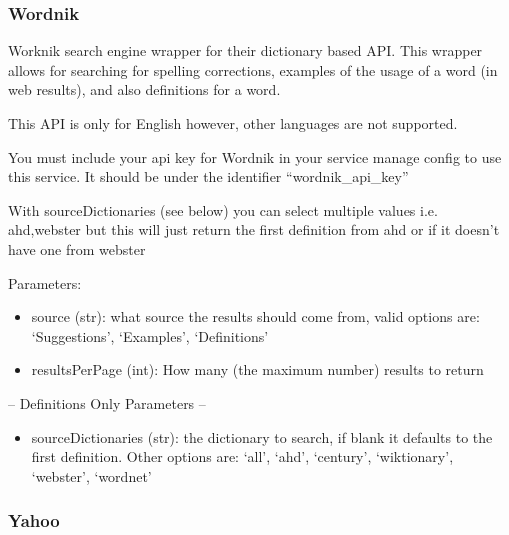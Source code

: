 \documentclass[letterpaper,10pt,english]{sphinxmanual}
\begin{document}
\subsubsection{Wordnik}
\label{api2.0:wordnik}

\begin{fulllineitems}
\label{api2.0:puppy.search.engine.Wordnik}
Worknik search engine wrapper for their dictionary based API. This wrapper allows for searching for spelling corrections, examples of the usage of a word (in web results),
and also definitions for a word.

This API is only for English however, other languages are not supported.

You must include your api key for Wordnik in your service manage config to use this service. It should be under the identifier ``wordnik\_api\_key''

With sourceDictionaries (see below) you can select multiple values i.e. ahd,webster but this will just return the first definition from ahd or if it doesn't have one from webster

Parameters:
\begin{itemize}
\item {} 
source (str): what source the results should come from, valid options are: `Suggestions', `Examples', `Definitions'

\item {} 
resultsPerPage (int): How many (the maximum number) results to return

\end{itemize}

-- Definitions Only Parameters --
\begin{itemize}
\item {} 
sourceDictionaries (str): the dictionary to search, if blank it defaults to the first definition. Other options are: `all', `ahd', `century', `wiktionary', `webster', `wordnet'

\end{itemize}

\end{fulllineitems}



\subsubsection{Yahoo}
\label{api2.0:yahoo}
\end{document}
